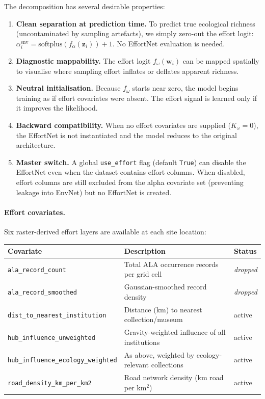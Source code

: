 \documentclass{article}
\begin{document}
The decomposition has several desirable properties:
\begin{enumerate}
    \item \textbf{Clean separation at prediction time.} To predict true ecological richness (uncontaminated by sampling artefacts), we simply zero-out the effort logit: $\alpha_i^{\text{env}} = \text{softplus}(f_\alpha(\mathbf{z}_i)) + 1$. No EffortNet evaluation is needed.
    \item \textbf{Diagnostic mappability.} The effort logit $f_\omega(\mathbf{w}_i)$ can be mapped spatially to visualise where sampling effort inflates or deflates apparent richness.
    \item \textbf{Neutral initialisation.} Because $f_\omega$ starts near zero, the model begins training as if effort covariates were absent. The effort signal is learned only if it improves the likelihood.
    \item \textbf{Backward compatibility.} When no effort covariates are supplied ($K_\omega = 0$), the EffortNet is not instantiated and the model reduces to the original architecture.
    \item \textbf{Master switch.} A global \texttt{use\_effort} flag (default \texttt{True}) can disable the EffortNet even when the dataset contains effort columns. When disabled, effort columns are still excluded from the alpha covariate set (preventing leakage into EnvNet) but no EffortNet is created.
\end{enumerate}

\paragraph{Effort covariates.}
Six raster-derived effort layers are available at each site location:

\begin{center}
\begin{tabular}{lll}
    \toprule
    Covariate & Description & Status \\
    \midrule
    \texttt{ala\_record\_count} & Total ALA occurrence records per grid cell & \textit{dropped} \\
    \texttt{ala\_record\_smoothed} & Gaussian-smoothed record density & \textit{dropped} \\
    \texttt{dist\_to\_nearest\_institution} & Distance (km) to nearest collection/museum & active \\
    \texttt{hub\_influence\_unweighted} & Gravity-weighted influence of all institutions & active \\
    \texttt{hub\_influence\_ecology\_weighted} & As above, weighted by ecology-relevant collections & active \\
    \texttt{road\_density\_km\_per\_km2} & Road network density (km road per km$^2$) & active \\
    \bottomrule
\end{tabular}
\end{center}
\end{document}
